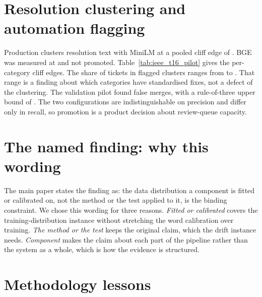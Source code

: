 \documentclass[conference,onecolumn,a4paper]{IEEEtran}
\begin{document}
\section{Resolution clustering and automation flagging}
Production clusters resolution text with MiniLM at a pooled cliff edge of . BGE was measured at  and not promoted. Table~\ref{tab:ieee_t16_pilot} gives the per-category cliff edges. The share of tickets in flagged clusters ranges from  to . That range is a finding about which categories have standardised fixes, not a defect of the clustering. The validation pilot found  false merges, with a rule-of-three upper bound of . The two configurations are indistinguishable on precision and differ only in recall, so promotion is a product decision about review-queue capacity.



\section{The named finding: why this wording}
The main paper states the finding as: the data distribution a component is fitted or calibrated on, not the method or the test applied to it, is the binding constraint. We chose this wording for three reasons. \emph{Fitted or calibrated} covers the training-distribution instance without stretching the word calibration over training. \emph{The method or the test} keeps the original claim, which the drift instance needs. \emph{Component} makes the claim about each part of the pipeline rather than the system as a whole, which is how the evidence is structured.

\section{Methodology lessons}
\end{document}
